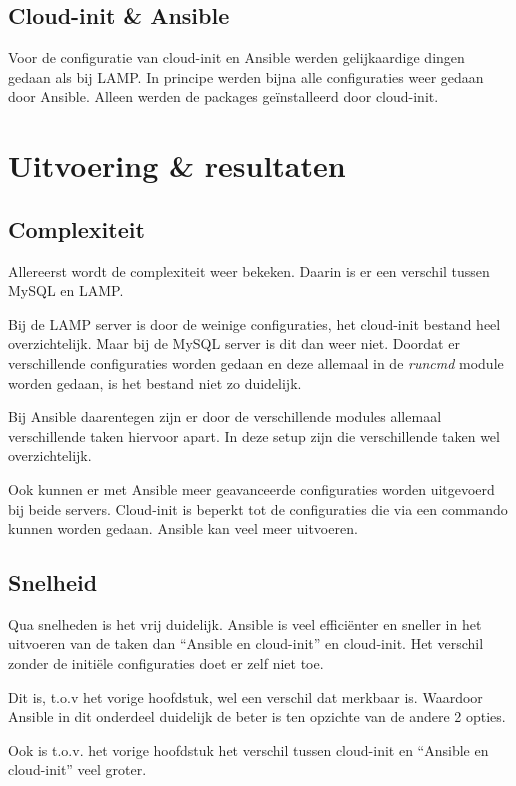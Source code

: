 \subsection{Cloud-init \& Ansible}
Voor de configuratie van cloud-init en Ansible werden gelijkaardige dingen gedaan als bij LAMP. In principe werden bijna alle configuraties weer gedaan door Ansible. Alleen werden de packages geïnstalleerd door cloud-init.

\section{Uitvoering \& resultaten}
\subsection{Complexiteit}
Allereerst wordt de complexiteit weer bekeken. Daarin is er een verschil tussen MySQL en LAMP.

Bij de LAMP server is door de weinige configuraties, het cloud-init bestand heel overzichtelijk. Maar bij de MySQL server is dit dan weer niet. Doordat er verschillende configuraties worden gedaan en deze allemaal in de \textit{runcmd} module worden gedaan, is het bestand niet zo duidelijk. 

Bij Ansible daarentegen zijn er door de verschillende modules allemaal verschillende taken hiervoor apart. In deze setup zijn die verschillende taken wel overzichtelijk. 

Ook kunnen er met Ansible meer geavanceerde configuraties worden uitgevoerd bij beide servers. Cloud-init is beperkt tot de configuraties die via een commando kunnen worden gedaan. Ansible kan veel meer uitvoeren. 

\newpage
\subsection{Snelheid}
Qua snelheden is het vrij duidelijk. Ansible is veel efficiënter en sneller in het uitvoeren van de taken dan ``Ansible en cloud-init'' en cloud-init. Het verschil zonder de initiële configuraties doet er zelf niet toe. 

Dit is, t.o.v het vorige hoofdstuk, wel een verschil dat merkbaar is. Waardoor Ansible in dit onderdeel duidelijk de beter is ten opzichte van de andere 2 opties.

Ook is t.o.v. het vorige hoofdstuk het verschil tussen cloud-init en ``Ansible en cloud-init'' veel groter.

